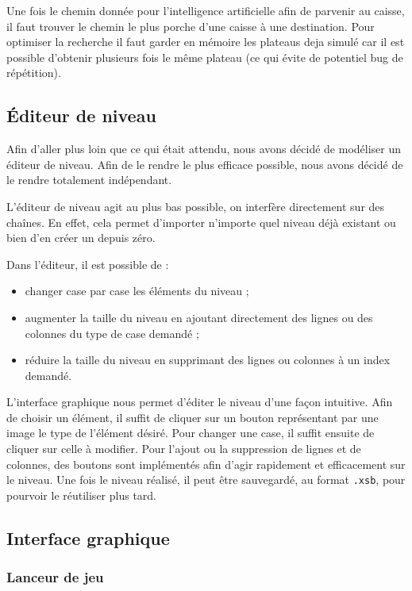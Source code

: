 \documentclass[a4paper, 11pt]{report}
\begin{document}
Une fois le chemin donnée pour l'intelligence artificielle afin de parvenir au caisse, il faut trouver le chemin le plus porche d'une caisse à une destination. Pour optimiser la recherche il faut garder en mémoire les plateaus deja simulé car il est possible d'obtenir plusieurs fois le même plateau (ce qui évite de potentiel bug de répétition).\\

\subsection{Éditeur de niveau}
Afin d'aller plus loin que ce qui était attendu, nous avons décidé de modéliser un éditeur de niveau. Afin de le rendre le plus efficace possible, nous avons décidé de le rendre totalement indépendant.

L’éditeur de niveau agit au plus bas possible, on interfère directement sur des chaînes. En effet, cela permet d'importer n'importe quel niveau déjà existant ou bien d'en créer un depuis zéro.

Dans l'éditeur, il est possible de :
\begin{itemize}
\item changer case par case les éléments du niveau ;
\item augmenter la taille du niveau en ajoutant directement des lignes ou des colonnes du type de case demandé ;
\item réduire la taille du niveau en supprimant des lignes ou colonnes à un index demandé.
\end{itemize}

L'interface graphique nous permet d’éditer le niveau d'une façon intuitive. Afin de choisir un élément, il suffit de cliquer sur un bouton représentant par une image le type de l'élément désiré. Pour changer une case, il suffit ensuite de cliquer sur celle à modifier. Pour l'ajout ou la suppression de lignes et de colonnes, des boutons sont implémentés afin d'agir rapidement et efficacement sur le niveau. Une fois le niveau réalisé, il peut être sauvegardé, au format \texttt{.xsb}, pour pourvoir le réutiliser plus tard.

\subsection{Interface graphique}

\subsubsection{Lanceur de jeu}
\end{document}
